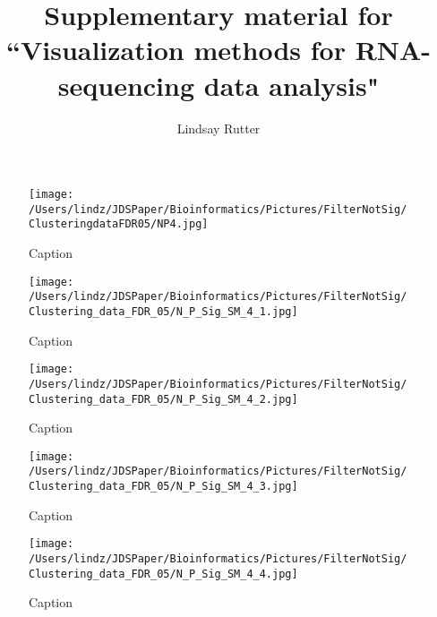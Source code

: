 \documentclass{article}
\begin{document}
\title{Supplementary material for ``Visualization methods for RNA-sequencing data analysis"}
\author{Lindsay Rutter}

\maketitle

\begin{figure}[!p]
\centerline{\texttt{[image: /Users/lindz/JDSPaper/Bioinformatics/Pictures/FilterNotSig/ClusteringdataFDR05/NP4.jpg]}}
\caption{Caption
\label{suppNonSigCluster}}
\end{figure}

\begin{figure}[!p]
\centerline{\texttt{[image: /Users/lindz/JDSPaper/Bioinformatics/Pictures/FilterNotSig/Clustering\_data\_FDR\_05/N\_P\_Sig\_SM\_4\_1.jpg]}}
\caption{Caption
\label{suppSMCluster1}}
\end{figure}

\begin{figure}[!p]
\centerline{\texttt{[image: /Users/lindz/JDSPaper/Bioinformatics/Pictures/FilterNotSig/Clustering\_data\_FDR\_05/N\_P\_Sig\_SM\_4\_2.jpg]}}
\caption{Caption
\label{suppSMCluster2}}
\end{figure}
  
\begin{figure}[!p]
\centerline{\texttt{[image: /Users/lindz/JDSPaper/Bioinformatics/Pictures/FilterNotSig/Clustering\_data\_FDR\_05/N\_P\_Sig\_SM\_4\_3.jpg]}}
\caption{Caption
\label{suppSMCluster3}}
\end{figure}  
  
\begin{figure}[!p]
\centerline{\texttt{[image: /Users/lindz/JDSPaper/Bioinformatics/Pictures/FilterNotSig/Clustering\_data\_FDR\_05/N\_P\_Sig\_SM\_4\_4.jpg]}}
\caption{Caption
\label{suppSMCluster4}}
\end{figure}  
  
\end{document}
